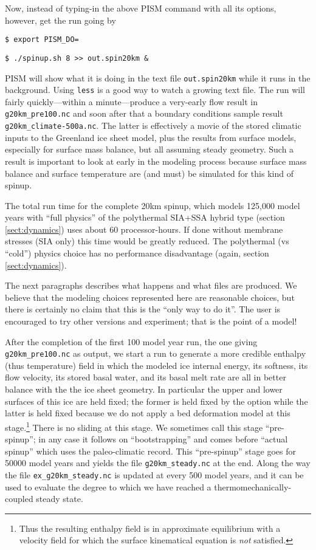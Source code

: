 Now, instead of typing-in the above PISM command with all its options, however, get the run going by

\verb|$ export PISM_DO=|

\verb|$ ./spinup.sh 8 >> out.spin20km &|

\noindent PISM will show what it is doing in the text file \verb|out.spin20km| while it runs in the background.  Using \verb|less| is a good way to watch a growing text file.  The run will fairly quickly---within a minute---produce a very-early flow result in \verb|g20km_pre100.nc| and soon after that a boundary conditions sample result \verb|g20km_climate-500a.nc|.  The latter is effectively a movie of the stored climatic inputs to the Greenland ice sheet model, plus the results from surface models, especially for surface mass balance, but all assuming steady geometry.  Such a result is important to look at early in the modeling process because surface mass balance and surface temperature are (and must) be simulated for this kind of spinup.

The total run time for the complete 20km spinup, which models 125,000 model years with ``full physics'' of the polythermal SIA+SSA hybrid type (section \ref{sect:dynamics}) uses about 60 processor-hours.  If done without membrane stresses (SIA only) this time would be greatly reduced.  The polythermal (vs ``cold'') physics choice has no performance disadvantage (again, section \ref{sect:dynamics}).

The next paragraphs describes what happens and what files are produced.  We believe that the modeling choices represented here are reasonable choices, but there is certainly no claim that this is the ``only way to do it''.  The user is encouraged to try other versions and experiment; that is the point of a model!

After the completion of the first 100 model year run, the one giving \verb|g20km_pre100.nc| as output, we start a run to generate a more credible enthalpy (thus temperature) field in which the modeled ice internal energy, its softness, its flow velocity, its stored basal water, and its basal melt rate are all in better balance with the the ice sheet geometry.  In particular the upper and lower surfaces of this ice are held fixed; the former is held fixed by the option  while the latter is held fixed because we do not apply a bed deformation model at this stage.\footnote{Thus the resulting enthalpy field is in approximate equilibrium with a velocity field for which the surface kinematical equation \cite{Fowler} is \emph{not} satisfied.}  There is no sliding at this stage.  We sometimes call this stage ``pre-spinup''; in any case it follows on ``bootstrapping'' and comes before ``actual spinup'' which uses the paleo-climatic record.  This ``pre-spinup'' stage goes for 50000 model years and yields the file \verb|g20km_steady.nc| at the end.  Along the way the file \verb|ex_g20km_steady.nc| is updated at every 500 model years, and it can be used to evaluate the degree to which we have reached a thermomechanically-coupled steady state.

